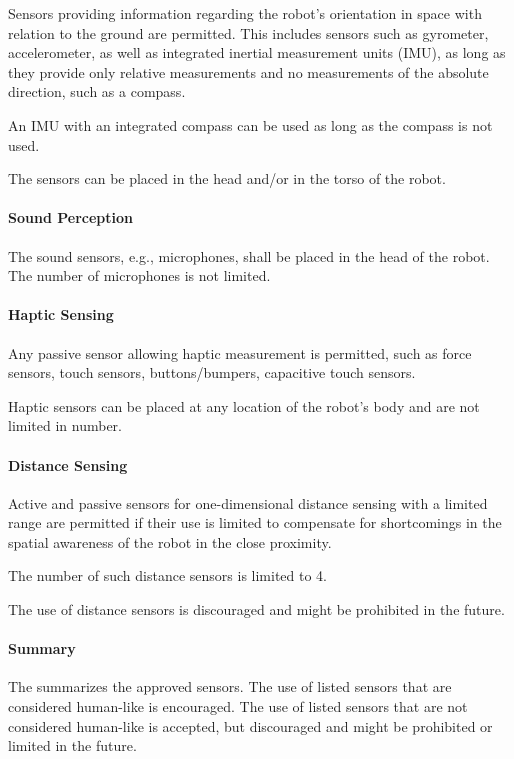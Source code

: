 Sensors providing information regarding the robot's orientation in space with relation to the ground are permitted. This includes sensors such as gyrometer, accelerometer, as well as integrated inertial measurement units (IMU), as long as they provide only relative measurements and no measurements of the absolute direction, such as a compass.

An IMU with an integrated compass can be used as long as the compass is not used.

The sensors can be placed in the head and/or in the torso of the robot.

\paragraph{Sound Perception}
The sound sensors, e.g., microphones, shall be placed in the head of the robot.
The number of microphones is not limited.

\paragraph{Haptic Sensing}
Any passive sensor allowing haptic measurement is permitted, such as force sensors, touch sensors, buttons/bumpers, capacitive touch sensors.

Haptic sensors can be placed at any location of the robot's body and are not limited in number.


\paragraph{Distance Sensing}

Active and passive sensors for one-dimensional distance sensing with a limited range are permitted if their use is limited to compensate for shortcomings in the spatial awareness of the robot in the close proximity.

The number of such distance sensors is limited to 4.

The use of distance sensors is discouraged and might be prohibited in the future.

\paragraph{Summary}
The  summarizes the approved sensors.
The use of listed sensors that are considered human-like is encouraged.
The use of listed sensors that are not considered human-like is accepted, but discouraged and might be prohibited or limited in the future.

